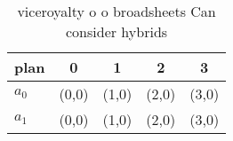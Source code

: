 \documentclass[a4paper]{article}
\begin{document}
\begin{table}
\begin{adjustbox}{width=0.8\columnwidth}
\begin{tabular}{|l|l|l|l|l|}
\hline
\textbf{plan} & \multicolumn{1}{c|}{\textbf{0}} & \multicolumn{1}{c|}{\textbf{1}} & \multicolumn{1}{c|}{\textbf{2}} & \multicolumn{1}{c|}{\textbf{3}} \\ \hline
\textbf{$a_0$}  & (0,0) & (1,0) & (2,0) & (3,0) \\ \hline
\textbf{$a_1$}  & (0,0) & (1,0) & (2,0) & (3,0) \\ \hline
\end{tabular}
\end{adjustbox}
\caption{viceroyalty o o broadsheets Can consider hybrids 
}
\end{table}
\end{document}

